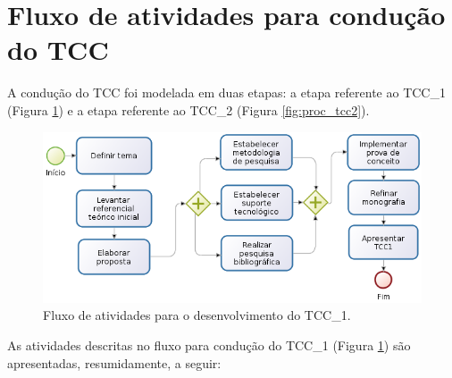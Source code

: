 

\section{Fluxo de atividades para condução do TCC}\label{sec:proc_tcc}

A condução do TCC foi modelada em duas etapas: a etapa referente ao TCC\_1 (Figura \ref{fig:proc_tcc1}) e a etapa referente ao TCC\_2 (Figura \ref{fig:proc_tcc2}).

\begin{figure}[!htb]
\centering
\includegraphics[scale=0.6]{figuras/processo_tcc1}
\caption{Fluxo de atividades para o desenvolvimento do TCC\_1.}
\label{fig:proc_tcc1}
\end{figure}



As atividades descritas no fluxo para condução do TCC\_1 (Figura \ref{fig:proc_tcc1}) são apresentadas, resumidamente, a seguir:

